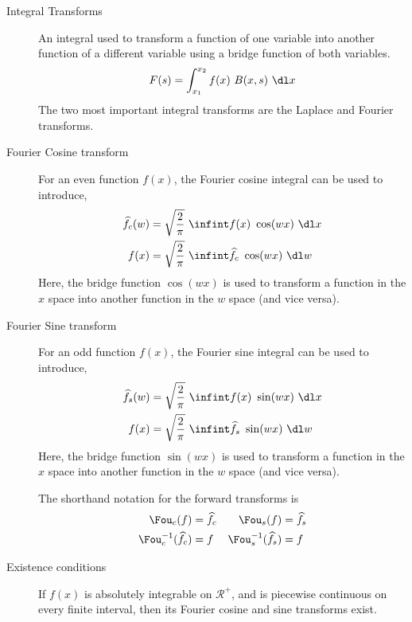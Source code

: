 \begin{description}
    \item[Integral Transforms] An integral used to transform a function of one variable
        into another function of a different variable using a bridge function of both
        variables.
        \begin{align}
            F(s) = \int_{x_1}^{x_2} f(x)\ B(x, s)\ \dl x
        \end{align}
        The two most important integral transforms are the Laplace and Fourier transforms.

    \item[Fourier Cosine transform] For an even function $ f(x) $, the Fourier cosine
        integral can be used to introduce,
        \begin{align}
            \widehat{f}_c(w) & = \sqrt{\frac{2}{\pi}}\ \infint f(x)\ \cos(wx)\ \dl x          \\
            f(x)             & = \sqrt{\frac{2}{\pi}}\ \infint \widehat{f}_c\ \cos(wx)\ \dl w
        \end{align}
        Here, the bridge function $ \cos(wx) $ is used to transform a function in the
        $ x $ space into another function in the $ w $ space (and vice versa).

    \item[Fourier Sine transform] For an odd function $ f(x) $, the Fourier sine
        integral can be used to introduce,
        \begin{align}
            \widehat{f}_s(w) & = \sqrt{\frac{2}{\pi}}\ \infint f(x)\ \sin(wx)\ \dl x          \\
            f(x)             & = \sqrt{\frac{2}{\pi}}\ \infint \widehat{f}_s\ \sin(wx)\ \dl w
        \end{align}
        Here, the bridge function $ \sin(wx) $ is used to transform a function in the
        $ x $ space into another function in the $ w $ space (and vice versa). \par
        The shorthand notation for the forward transforms is
        \begin{align}
            \Fou_c(f)                  & = \widehat{f}_c &
            \Fou_s(f)                  & = \widehat{f}_s   \\
            \Fou_c^{-1}(\widehat{f}_c) & = f             &
            \Fou_s^{-1}(\widehat{f}_s) & = f
        \end{align}

    \item[Existence conditions] If $ f(x) $ is absolutely integrable on
        $ \mathcal{R}^+$, and is piecewise continuous on every finite interval, then its
        Fourier cosine and sine transforms exist.


\end{description}
